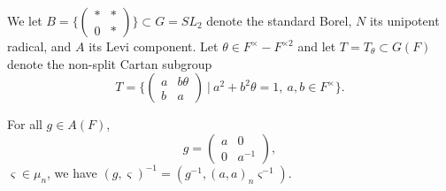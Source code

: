 We let $B=\{\left( 
\begin{array}{cc}
\ast  & * \\ 
0 & *
\end{array}
\right) \}\subset G=SL_2$ denote the standard Borel, $N$ its unipotent
radical, and $A$ its Levi component. Let
$\theta\in F^\times -F^{\times 2}$ and let
$T=T_\theta\subset G(F)$ denote the non-split Cartan subgroup
\[
T=\{
    \left(
    \begin{array}{cc}
    a&b\theta\\
    b&a
    \end{array}
    \right)
    \ |\ a^2+b^2\theta =1,\ a,b\in F^\times
  \}.
\]
\begin{lemma}
For all $g\in A(F)$, 
\[
g=\left( 
\begin{array}{cc}
a & 0 \\ 
0 & a^{-1}
\end{array}
\right) ,
\]
$\varsigma \in \mu _n$, we have $(g,\varsigma
)^{-1}=(g^{-1},(a,a)_n\varsigma ^{-1})$.
\end{lemma}

